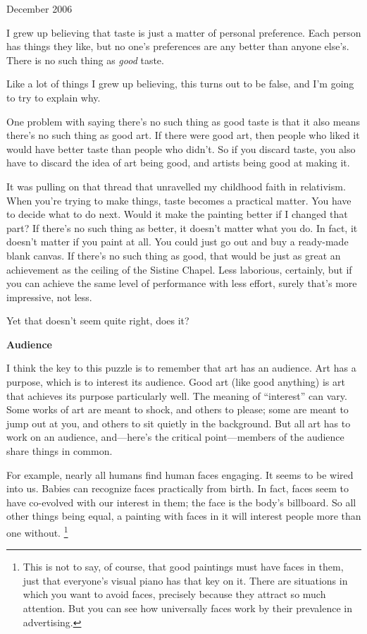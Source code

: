 \documentclass[12pt]{book}
\begin{document}
December 2006

I grew up believing that taste is just a matter of personal preference.
Each person has things they like, but no one's preferences are any
better than anyone else's. There is no such thing as \emph{good} taste.

Like a lot of things I grew up believing, this turns out to be false,
and I'm going to try to explain why.

One problem with saying there's no such thing as good taste is that it
also means there's no such thing as good art. If there were good art,
then people who liked it would have better taste than people who didn't.
So if you discard taste, you also have to discard the idea of art being
good, and artists being good at making it.

It was pulling on that thread that unravelled my childhood faith in
relativism. When you're trying to make things, taste becomes a practical
matter. You have to decide what to do next. Would it make the painting
better if I changed that part? If there's no such thing as better, it
doesn't matter what you do. In fact, it doesn't matter if you paint at
all. You could just go out and buy a ready-made blank canvas. If there's
no such thing as good, that would be just as great an achievement as the
ceiling of the Sistine Chapel. Less laborious, certainly, but if you can
achieve the same level of performance with less effort, surely that's
more impressive, not less.

Yet that doesn't seem quite right, does it?

\textbf{Audience}

I think the key to this puzzle is to remember that art has an audience.
Art has a purpose, which is to interest its audience. Good art (like
good anything) is art that achieves its purpose particularly well. The
meaning of ``interest'' can vary. Some works of art are meant to shock,
and others to please; some are meant to jump out at you, and others to
sit quietly in the background. But all art has to work on an audience,
and---here's the critical point---members of the audience share things
in common.

For example, nearly all humans find human faces engaging. It seems to be
wired into us. Babies can recognize faces practically from birth. In
fact, faces seem to have co-evolved with our interest in them; the face
is the body's billboard. So all other things being equal, a painting
with faces in it will interest people more than one without.
\footnote{This is not to say, of course, that good paintings must have
faces in them, just that everyone's visual piano has that key on it.
There are situations in which you want to avoid faces, precisely because
they attract so much attention. But you can see how universally faces
work by their prevalence in advertising.}
\end{document}
